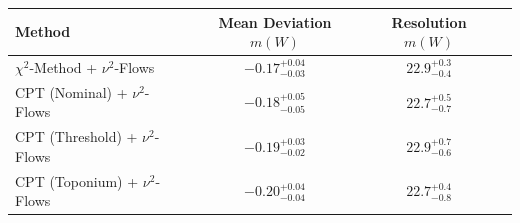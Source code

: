     \begin{tabular}{lccc}
        \toprule
        Method & Mean Deviation $m(W)$ & Resolution $m(W)$ \\
        \midrule
        $\chi^2$-Method + $\nu^2$-Flows & $-0.17^{+0.04}_{-0.03}$ & $22.9^{+0.3}_{-0.4}$ \\
        CPT (Nominal) + $\nu^2$-Flows & $-0.18^{+0.05}_{-0.05}$ & $22.7^{+0.5}_{-0.7}$ \\
        CPT (Threshold) + $\nu^2$-Flows & $-0.19^{+0.03}_{-0.02}$ & $22.9^{+0.7}_{-0.6}$ \\
        CPT (Toponium) + $\nu^2$-Flows & $-0.20^{+0.04}_{-0.04}$ & $22.7^{+0.4}_{-0.8}$ \\
        \bottomrule
    \end{tabular}